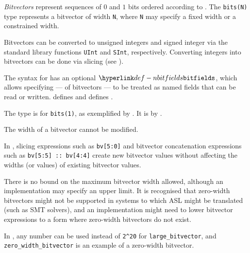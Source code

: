 \hypertarget{bitvectortypeterm}{}
\emph{Bitvectors} represent sequences of $0$ and $1$ bits ordered according to .
%
The \texttt{bits(N)} type represents a bitvector of width \texttt{N},
where \texttt{N} may specify a fixed width or a constrained width.

%
Bitvectors can be converted to unsigned integers and signed integer
via the standard library functions
\verb|UInt| and \verb|SInt|, respectively.
Converting integers into bitvectors can be done via slicing
(see ).

%
The syntax for \bitvectortypesterm{} has an optional $\Nbitfields$,
which allows specifying \emph{\bitfieldsterm} ---
\bitslicesterm{} of bitvectors --- to be treated as named
fields that can be read or written.
 defines \bitfieldsterm{}
and  defines \bitslicesterm{}.

The \Tbit{} type is \syntacticsugar{} for \texttt{bits(1)},
as exemplified by .
It is \desugared{} by .


The width of a bitvector cannot be modified.

In , slicing expressions such as \verb|bv[5:0]|
and bitvector concatenation expressions such as \verb|bv[5:5] :: bv[4:4]|
create new bitvector values without affecting the widths (or values)
of existing bitvector values.

There is no bound on the maximum bitvector width allowed, although an implementation may specify an upper
limit.
It is recognised that zero-width bitvectors might not be supported in systems
to which ASL might be translated (such as SMT solvers),
and an implementation might need to lower bitvector
expressions to a form where zero-width bitvectors do not exist.

In , any number can be used instead of \verb|2^20| for
\verb|large_bitvector|, and \verb|zero_width_bitvector| is an example of a zero-width bitvector.


